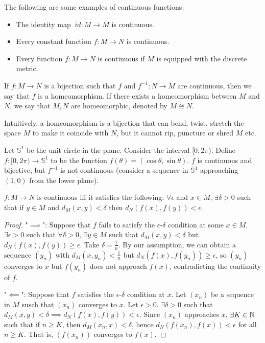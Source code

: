 \begin{ex}
    The following are some examples of continuous functions:
    \begin{itemize}
        \item The identity map $~id : M\to M$ is continuous.
        \item Every constant function $f: M\to N$ is continuous.
        \item Every function $f: M\to N$ is continuous if $M$ is equipped with the discrete metric.
    \end{itemize}
\end{ex}

\begin{df}
    If $f: M\to N$ is a bijection such that $f$ and $f^{-1}: N\to M$ are continuous, then we say that $f$ is a homeomorphism. If there exists a homeomorphism between $M$ and $N$, we say that $M, N$ are homeomorphic, denoted by $M\cong N$.
\end{df}

Intuitively, a homeomorphism is a bijection that can bend, twist, stretch the space $M$ to make it coincide with $N$, but it cannot rip, puncture or shred $M$ etc.

\begin{ex}
    Let $\mathbb S^1$ be the unit circle in the plane. Consider the interval $[0, 2\pi)$. Define $f: [0, 2\pi) \to \mathbb S^1$ to be the function $f(\theta) = (\cos\theta, \sin\theta)$. $f$ is continuous and bijective, but $f^{-1}$ is not continuous (consider a sequence in $\mathbb S^1$ approaching $(1, 0)$ from the lower plane).
\end{ex}

\begin{prop}
    $f: M\to N$ is continuous iff it satisfies the following: $\forall \epsilon$ and $x\in M$, $\exists \delta > 0$ such that if $y\in M$ and $d_M(x, y) < \delta$ then $d_N(f(x), f(y)) < \epsilon$.
    \begin{proof}
        "$\implies$": Suppose that $f$ fails to satisfy the $\epsilon$-$\delta$ condition at some $x\in M$. $\exists \epsilon > 0$ such that $\forall \delta > 0$, $\exists y\in M$ such that $d_M(x, y) < \delta$ but $d_N(f(x), f(y)) \geq \epsilon$. Take $\delta = \frac 1n$. By our assumption, we can obtain a sequence $(y_n)$ with $d_M(x, y_n) < \frac 1n$ but $d_N(f(x), f(y_n)) \geq \epsilon$, so $(y_n)$ converges to $x$ but $f(y_n)$ does not approach $f(x)$, contradicting the continuity of $f$.

        "$\impliedby$": Suppose that $f$ satisfies the $\epsilon$-$\delta$ condition at $x$. Let $(x_n)$ be a sequence in $M$ susch that $(x_n)$ converges to $x$. Let $\epsilon > 0$. $\exists \delta > 0$ such that $d_M(x, y) < \delta \implies d_N(f(x), f(y)) < \epsilon$. Since $(x_n)$ approaches $x$, $\exists K \in {\mathbb N}$ such that if $n\geq K$, then $d_M(x_n, x) < \delta$, hence $d_N(f(x_n), f(x)) < \epsilon$ for all $n\geq K$. That is, $(f(x_n))$ converges to $f(x)$.
    \end{proof}
\end{prop}

